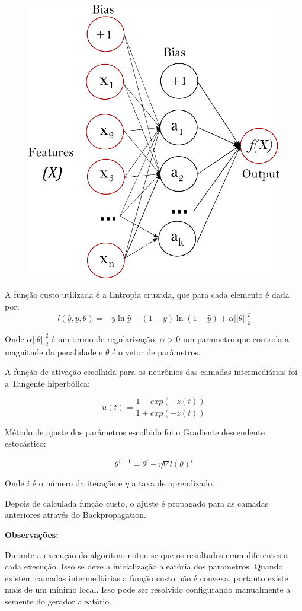 \documentclass[11pt,a4paper]{article}
\numberwithin{equation}{section}
\begin{document}
\begin{figure}[H]
\centering
  \includegraphics[width=0.43\linewidth]{../img/multilayerperceptron_network.png}
  \label{fig:percep}
\end{figure}%


A função custo utilizada é a Entropia cruzada, que para cada elemento é dada por:
\[l(\hat{y},y,\theta) = -y \ln{\hat{y}} - (1-y) \ln{(1 - \hat{y})} + \alpha ||\theta||_2^2\]

Onde $\alpha ||\theta||_2^2$ é um termo de regularização, $\alpha > 0$ um parametro que controla a magnitude da penalidade e $\theta$ é o vetor de parâmetros.

A função de ativação escolhida para os neurônios das camadas intermediárias foi a Tangente hiperbólica:

\[ u(t) = \frac{1- exp(-z(t))}{1+exp(-z(t))}\]

 Método de ajuste dos parâmetros escolhido foi o Gradiente descendente estocástico:

\[\theta^{i+1} = \theta^i - \eta \nabla {l}({\theta})^{i}\]

Onde $i$ é o número da iteração e $\eta$ a taxa de aprendizado. 

Depois de calculada função custo, o ajuste é propagado para as camadas anteriores através do Backpropagation.


\textbf{Observações:}

Durante a execução do algoritmo notou-se que os resultados eram diferentes a cada execução. Isso se deve a inicialização aleatória dos parametros. Quando existem camadas intermediárias a função custo não é convexa, portanto existe mais de um mínimo local. Isso pode ser resolvido configurando manualmente a semente do gerador aleatório.
\end{document}

